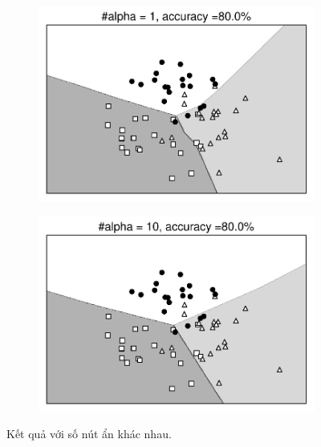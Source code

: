 \begin{figure}[t]
    \begin{subfigure}{0.45\textwidth}
    \includegraphics[width=0.99\linewidth]{ebookML_src/src/mlp/nn_overfitting_1.pdf}
    \caption{}
    \end{subfigure}
    \begin{subfigure}{0.45\textwidth}
    \includegraphics[width=0.99\linewidth]{ebookML_src/src/mlp/nn_overfitting_10.pdf}
    \caption{}
    \end{subfigure}
    \caption{
     Kết quả với số nút ẩn khác nhau.
    }
    \label{fig:14_11}
\end{figure}


 
